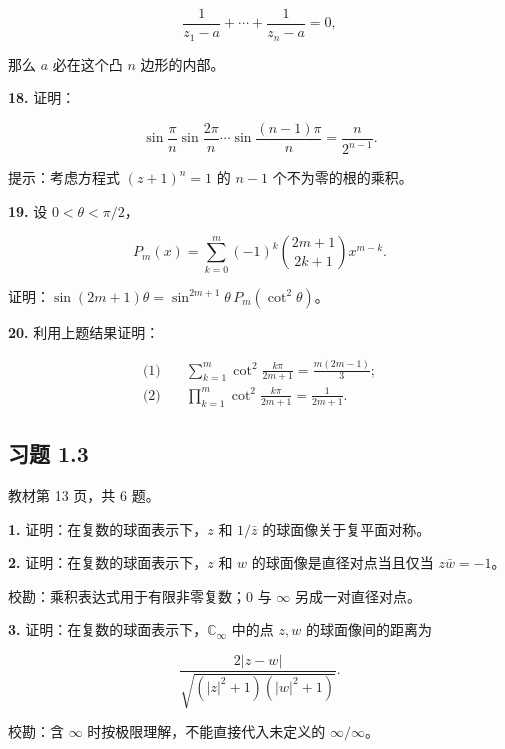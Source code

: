 \documentclass[11pt,a4paper]{article}
\begin{document}
\[
\frac1{z_1-a}+\cdots+\frac1{z_n-a}=0,
\]

那么 \(a\) 必在这个凸 \(n\) 边形的内部。

\par{}
\noindent\textbf{18.} 证明：

\[
\sin\frac\pi n\sin\frac{2\pi}n\cdots\sin\frac{(n-1)\pi}n
=\frac n{2^{n-1}}.
\]

提示：考虑方程式 \((z+1)^n=1\) 的 \(n-1\) 个不为零的根的乘积。

\par{}
\noindent\textbf{19.} 设 \(0<\theta<\pi/2\)，

\[
P_m(x)=\sum_{k=0}^m(-1)^k\binom{2m+1}{2k+1}x^{m-k}.
\]

证明：\(\sin(2m+1)\theta=\sin^{2m+1}\theta\,P_m(\cot^2\theta)\)。

\par{}
\noindent\textbf{20.} 利用上题结果证明：

\[
\begin{aligned}
\text{(1)}\quad &\sum_{k=1}^m\cot^2\frac{k\pi}{2m+1}=\frac{m(2m-1)}3;\\
\text{(2)}\quad &\prod_{k=1}^m\cot^2\frac{k\pi}{2m+1}=\frac1{2m+1}.
\end{aligned}
\]

\subsection{习题 1.3}\label{ux4e60ux9898-1.3}

教材第 13 页，共 6 题。

\par{}
\noindent\textbf{1.} 证明：在复数的球面表示下，\(z\) 和 \(1/\bar z\)
的球面像关于复平面对称。

\par{}
\noindent\textbf{2.} 证明：在复数的球面表示下，\(z\) 和 \(w\)
的球面像是直径对点当且仅当 \(z\bar w=-1\)。

校勘：乘积表达式用于有限非零复数；\(0\) 与 \(\infty\) 另成一对直径对点。

\par{}
\noindent\textbf{3.} 证明：在复数的球面表示下，\(\mathbb C_\infty\) 中的点
\(z,w\) 的球面像间的距离为

\[
\frac{2|z-w|}{\sqrt{(|z|^2+1)(|w|^2+1)}}.
\]

校勘：含 \(\infty\) 时按极限理解，不能直接代入未定义的
\(\infty/\infty\)。
\end{document}
